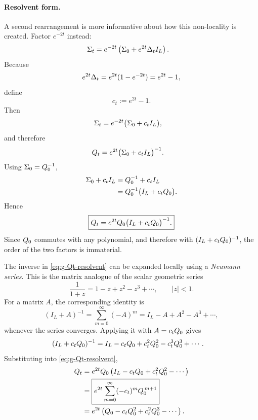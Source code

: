 \paragraph{Resolvent form.}
A second rearrangement is more informative about how this non-locality is
created. Factor $e^{-2t}$ instead:
\begin{align}
  \Sigma_t
  &=
  e^{-2t}
  \left(
    \Sigma_0+e^{2t}\Delta_t I_L
  \right).
\end{align}
Because
\begin{equation}
  e^{2t}\Delta_t
  =
  e^{2t}(1-e^{-2t})
  =
  e^{2t}-1,
\end{equation}
define
\begin{equation}
  c_t:=e^{2t}-1.
  \label{eq:g-ct-def}
\end{equation}
Then
\begin{align}
  \Sigma_t
  &=
  e^{-2t}
  \bigl(\Sigma_0+c_t I_L\bigr),
\end{align}
and therefore
\begin{align}
  Q_t
  &=
  e^{2t}
  \bigl(\Sigma_0+c_t I_L\bigr)^{-1}.
  \label{eq:g-res-step1}
\end{align}
Using $\Sigma_0=Q_0^{-1}$,
\begin{align}
  \Sigma_0+c_tI_L
  &=
  Q_0^{-1}+c_tI_L\\
  &=
  Q_0^{-1}
  \bigl(I_L+c_tQ_0\bigr).
\end{align}
Hence
\begin{equation}
  \boxed{
  Q_t
  =
  e^{2t}
  Q_0
  \bigl(I_L+c_tQ_0\bigr)^{-1}.
  }
  \label{eq:g-Qt-resolvent}
\end{equation}
Since $Q_0$ commutes with any polynomial, and therefore with
$(I_L+c_tQ_0)^{-1}$, the order of the two factors is immaterial.

The inverse in \eqref{eq:g-Qt-resolvent} can be expanded locally using a
\emph{Neumann series}. This is the matrix analogue of the scalar geometric
series
\begin{equation}
  \frac{1}{1+z}
  =
  1-z+z^2-z^3+\cdots,
  \qquad |z|<1.
\end{equation}
For a matrix $A$, the corresponding identity is
\begin{equation}
  (I_L+A)^{-1}
  =
  \sum_{m=0}^{\infty}(-A)^m
  =
  I_L-A+A^2-A^3+\cdots,
  \label{eq:g-neumann-general}
\end{equation}
whenever the series converges. Applying it with
$A=c_tQ_0$ gives
\begin{align}
  (I_L+c_tQ_0)^{-1}
  &=
  I_L
  -c_tQ_0
  +c_t^2Q_0^2
  -c_t^3Q_0^3
  +\cdots.
\end{align}
Substituting into \eqref{eq:g-Qt-resolvent},
\begin{align}
  Q_t
  &=
  e^{2t}
  Q_0
  \left(
    I_L
    -c_tQ_0
    +c_t^2Q_0^2
    -\cdots
  \right)\\
  &=
  \boxed{
  e^{2t}
  \sum_{m=0}^{\infty}
  (-c_t)^mQ_0^{\,m+1}
  }\\
  &=
  e^{2t}
  \left(
    Q_0
    -c_tQ_0^2
    +c_t^2Q_0^3
    -\cdots
  \right).
  \label{eq:g-Qt-res}
\end{align}

